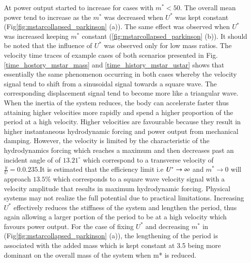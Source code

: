 At  power output started to increase for cases with $m^*<50$. The overall mean power tend to increase  as the $m^*$ was decreased when $U^*$ was kept constant (Fig\ref{fig:mstarcollapsed_parkinson} (a)). The same effect was observed when $U^*$ was increased keeping $m^*$ constant (\ref{fig:mstarcollapsed_parkinson} (b)). It should be noted that the influence of $U^*$ was observed only for low mass ratios.  The velocity time traces of example cases of both scenarios presented in Fig.\ref{time_hostory_mstar_mass} and \ref{time_history_mstar_ustar} shows that essentially the same phenomenon occurring in both cases whereby the velocity signal tend to shift from a sinusoidal signal towards a square wave. The corresponding displacement signal tend to become more like a triangular wave. When the inertia of the system reduces, the body can accelerate faster thus attaining higher velocities more rapidly and spend a higher proportion of the period at a high velocity. Higher velocities are favourable because they result in higher instantaneous hydrodynamic forcing and power output from mechanical damping. However, the velocity is limited by the characteristic of the hydrodynamics forcing which reaches a maximum and then decreases past an incident angle of of $13.21^{\circ}$ which correspond to a transverse velocity of $\frac{\dot{y}}{U}=0.0.235$.It is estimated that the efficiency limit i.e $U^{*} \rightarrow \infty$  and $m^* \rightarrow 0$ will approach $13.5\%$ which corresponds to a square wave velocity signal with a velocity amplitude that results in maximum  hydrodynamic forcing. Physical systems may not realize the full potential due to practical limitations. Increasing $U^*$ effectively reduces the stiffness of the system and lengthen the period, thus again allowing a larger portion of the period to be at a high velocity which favours power output. For the case of fixing $U^*$ and decreasing $m^*$ in (Fig\ref{fig:mstarcollapsed_parkinson} (a)), the lengthening of the period is associated with the added mass which is kept constant at 3.5 being more dominant on the overall mass of the system when m* is reduced. 


  












 


